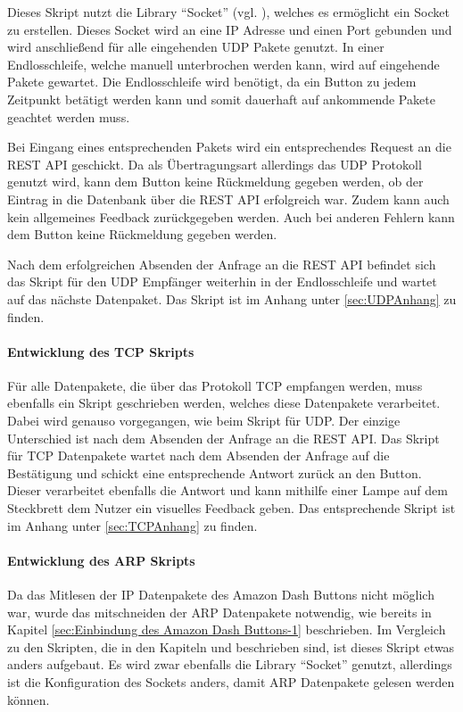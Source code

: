 Dieses Skript nutzt die Library ``Socket'' (vgl. \cite{.20.02.2017}), welches es ermöglicht ein Socket zu erstellen. Dieses Socket wird an eine \ac{IP} Adresse und einen Port gebunden und wird anschließend für alle eingehenden \ac{UDP} Pakete genutzt. In einer Endlosschleife, welche manuell unterbrochen werden kann, wird auf eingehende Pakete gewartet. Die Endlosschleife wird benötigt, da ein Button zu jedem Zeitpunkt betätigt werden kann und somit dauerhaft auf ankommende Pakete geachtet werden muss. 

Bei Eingang eines entsprechenden Pakets wird ein entsprechendes Request an die \ac{REST} \ac{API} geschickt. Da als Übertragungsart allerdings das \ac{UDP} Protokoll genutzt wird, kann dem Button keine Rückmeldung gegeben werden, ob der Eintrag in die Datenbank über die \ac{REST} \ac{API} erfolgreich war. Zudem kann auch kein allgemeines Feedback zurückgegeben werden. Auch bei anderen Fehlern kann dem Button keine Rückmeldung gegeben werden. 

Nach dem erfolgreichen Absenden der Anfrage an die \ac{REST} \ac{API} befindet sich das Skript für den \ac{UDP} Empfänger weiterhin in der Endlosschleife und wartet auf das nächste Datenpaket. 
Das Skript ist im Anhang unter \ref{sec:UDPAnhang} zu finden. 

\paragraph{Entwicklung des TCP Skripts}$\;$ \\  
\label{sec:Entwicklung des TCP Skripts-1} 
Für alle Datenpakete, die über das Protokoll \ac{TCP} empfangen werden, muss ebenfalls ein Skript geschrieben werden, welches diese Datenpakete verarbeitet. Dabei wird genauso vorgegangen, wie beim Skript für \ac{UDP}. Der einzige Unterschied ist nach dem Absenden der Anfrage an die \ac{REST} \ac{API}. Das Skript für \ac{TCP} Datenpakete wartet nach dem Absenden der Anfrage auf die Bestätigung und schickt eine entsprechende Antwort zurück an den Button. Dieser verarbeitet ebenfalls die Antwort und kann mithilfe einer Lampe auf dem Steckbrett dem Nutzer ein visuelles Feedback geben. 
Das entsprechende Skript ist im Anhang unter \ref{sec:TCPAnhang} zu finden.

\paragraph{Entwicklung des ARP Skripts}$\;$ \\  
\label{sec:Entwicklung des ARP Skripts-1} 
Da das Mitlesen der \ac{IP} Datenpakete des Amazon Dash Buttons nicht möglich war, wurde das mitschneiden der \ac{ARP} Datenpakete notwendig, wie bereits in Kapitel \ref{sec:Einbindung des Amazon Dash Buttons-1} beschrieben. 
Im Vergleich zu den Skripten, die in den Kapiteln  und  beschrieben sind, ist dieses Skript etwas anders aufgebaut. Es wird zwar ebenfalls die Library ``Socket'' genutzt, allerdings ist die Konfiguration des Sockets anders, damit \ac{ARP} Datenpakete gelesen werden können. 


